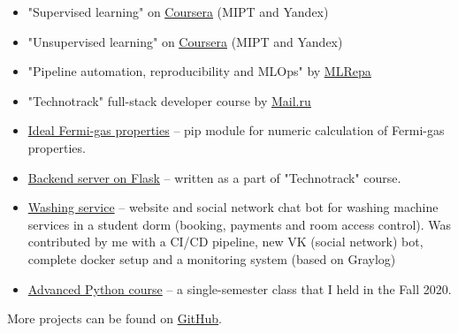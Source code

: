 
\begin{itemize}
	\item "Supervised learning" on \href{https://www.coursera.org/learn/supervised-learning?specialization=machine-learning-data-analysis}{\underline{Coursera}} (MIPT and Yandex)
	\item "Unsupervised learning" on \href{https://www.coursera.org/learn/unsupervised-learning?specialization=machine-learning-data-analysis}{\underline{Coursera}} (MIPT and Yandex)
    \item "Pipeline automation, reproducibility and MLOps" by \href{https://ml-repa.ru/reproducibility-pipelines-automation-mlops}{\underline{MLRepa}}
	\item "Technotrack" full-stack developer course by \href{https://track.mail.ru/}{\underline{Mail.ru}}
\end{itemize}


\begin{itemize}
    \item \href{https://github.com/alekseik1/ifg-py}{Ideal Fermi-gas properties} -- pip module for numeric calculation of Fermi-gas properties.
    \item \href{https://github.com/alekseik1/tt-ridesharing-backend}{Backend server on Flask} -- written as a part of "Technotrack" course.
    \item \href{https://github.com/alekseik1/drec_stud_site}{Washing service} -- website and social network chat bot for washing machine services in a student dorm (booking, payments and room access control). Was contributed by me with a CI/CD pipeline, new VK (social network) bot, complete docker setup and a monitoring system (based on Graylog)
    \item \href{https://github.com/alekseik1/advanced_python_1sem_2020}{Advanced Python course} -- a single-semester class that I held in the Fall 2020.
\end{itemize}
More projects can be found on \href{https://github.com/alekseik1/}{GitHub}.

